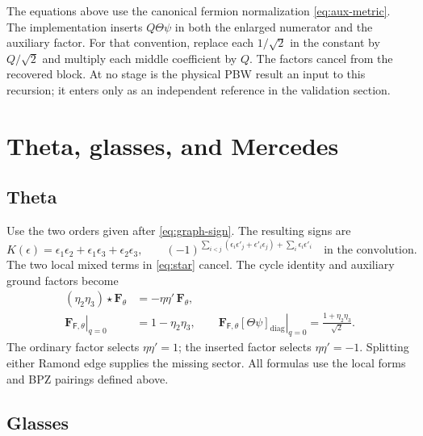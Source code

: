 \documentclass[11pt]{article}
\newcommand{\F}{\mathsf F}
\numberwithin{equation}{section}
\begin{document}
The equations above use the canonical fermion normalization
\eqref{eq:aux-metric}. The implementation inserts $Q\Theta\psi$ in both
the enlarged numerator and the auxiliary factor. For that convention,
replace each $1/\sqrt2$ in the constant by $Q/\sqrt2$ and multiply each
middle coefficient by $Q$. The factors cancel from the recovered block.
At no stage is the physical PBW result an input to this recursion; it
enters only as an independent reference in the validation section.

\section{Theta, glasses, and Mercedes}

\subsection{Theta}

Use the two orders given after \eqref{eq:graph-sign}. The resulting signs
are
\begin{equation}
 K(\epsilon)=\epsilon_1\epsilon_2+\epsilon_1\epsilon_3+
              \epsilon_2\epsilon_3,
 \qquad
 (-1)^{\sum_{i<j}(\epsilon_i\epsilon'_j+\epsilon'_i\epsilon_j)
                    +\sum_i\epsilon_i\epsilon'_i}
 \quad\text{in the convolution}.
 \label{eq:theta-specialization}
\end{equation}
The two local mixed terms in \eqref{eq:star} cancel. The cycle identity and
auxiliary ground factors become
\begin{align}
 (\eta_2\eta_3)\star\mathbf F_\theta
    &=-\eta\eta'\,\mathbf F_\theta,\nonumber\\
 \left.\mathbf F_{\F,\theta}\right|_{q=0}
    &=1-\eta_2\eta_3,\qquad
 \left.\mathbf F_{\F,\theta}[\Theta\psi]_{\mathrm{diag}}\right|_{q=0}
    =\frac{1+\eta_2\eta_3}{\sqrt2}.
 \label{eq:theta-ground}
\end{align}
The ordinary factor selects $\eta\eta'=1$; the inserted factor selects
$\eta\eta'=-1$. Splitting either Ramond edge supplies the missing sector.
All formulas use the local forms and BPZ pairings defined above.

\subsection{Glasses}
\end{document}
